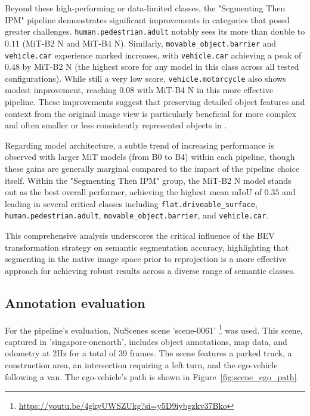 Beyond these high-performing or data-limited classes, the "Segmenting Then IPM" pipeline demonstrates significant improvements in categories that posed greater challenges. \texttt{human.pedestrian.adult} notably sees its  more than double to $0.11$ (MiT-B2 N and MiT-B4 N). Similarly, \texttt{movable\_object.barrier} and \texttt{vehicle.car} experience marked increases, with \texttt{vehicle.car} achieving a peak of $0.48$ by MiT-B2 N (the highest score for any model in this class across all tested configurations). While still a very low score, \texttt{vehicle.motorcycle} also shows modest improvement, reaching $0.08$ with MiT-B4 N in this more effective pipeline. These improvements suggest that preserving detailed object features and context from the original image view is particularly beneficial for more complex and often smaller or less consistently represented objects in .

Regarding model architecture, a subtle trend of increasing performance is observed with larger MiT models (from B0 to B4) within each pipeline, though these gains are generally marginal compared to the impact of the pipeline choice itself. Within the "Segmenting Then IPM" group, the MiT-B2 N model stands out as the best overall performer, achieving the highest mean mIoU of $0.35$ and leading in several critical classes including \texttt{flat.driveable\_surface}, \texttt{human.pedestrian.adult}, \texttt{movable\_object.barrier}, and \texttt{vehicle.car}. 

This comprehensive analysis underscores the critical influence of the BEV transformation strategy on semantic segmentation accuracy, highlighting that segmenting in the native image space prior to reprojection is a more effective approach for achieving robust results across a diverse range of semantic classes.


\subsection{Annotation evaluation}
For the pipeline's evaluation, NuScenes scene 'scene-0061' \footnote{\url{https://youtu.be/4gkyUWSZUkg?si=y5D9iybgzkv37Bko}} was used. This scene, captured in 'singapore-onenorth', includes object annotations, map data, and odometry at 2Hz for a total of 39 frames. The scene features a parked truck, a construction area, an intersection requiring a left turn, and the ego-vehicle following a van. The ego-vehicle's path is shown in Figure~\ref{fig:scene_ego_path}.

